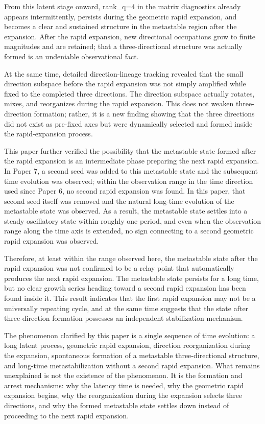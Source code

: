 \documentclass[
  a4paper,
]{article}
\begin{document}
From this latent stage onward, rank\_q=4 in the matrix diagnostics
already appears intermittently, persists during the geometric rapid
expansion, and becomes a clear and sustained structure in the metastable
region after the expansion. After the rapid expansion, new directional
occupations grow to finite magnitudes and are retained; that a
three-directional structure was actually formed is an undeniable
observational fact.

At the same time, detailed direction-lineage tracking revealed that the
small direction subspace before the rapid expansion was not simply
amplified while fixed to the completed three directions. The direction
subspace actually rotates, mixes, and reorganizes during the rapid
expansion. This does not weaken three-direction formation; rather, it is
a new finding showing that the three directions did not exist as
pre-fixed axes but were dynamically selected and formed inside the
rapid-expansion process.

This paper further verified the possibility that the metastable state
formed after the rapid expansion is an intermediate phase preparing the
next rapid expansion. In Paper 7, a second seed was added to this
metastable state and the subsequent time evolution was observed; within
the observation range in the time direction used since Paper 6, no
second rapid expansion was found. In this paper, that second seed itself
was removed and the natural long-time evolution of the metastable state
was observed. As a result, the metastable state settles into a steady
oscillatory state within roughly one period, and even when the
observation range along the time axis is extended, no sign connecting to
a second geometric rapid expansion was observed.

Therefore, at least within the range observed here, the metastable state
after the rapid expansion was not confirmed to be a relay point that
automatically produces the next rapid expansion. The metastable state
persists for a long time, but no clear growth series heading toward a
second rapid expansion has been found inside it. This result indicates
that the first rapid expansion may not be a universally repeating cycle,
and at the same time suggests that the state after three-direction
formation possesses an independent stabilization mechanism.

The phenomenon clarified by this paper is a single sequence of time
evolution: a long latent process, geometric rapid expansion, direction
reorganization during the expansion, spontaneous formation of a
metastable three-directional structure, and long-time metastabilization
without a second rapid expansion. What remains unexplained is not the
existence of the phenomenon. It is the formation and arrest mechanisms:
why the latency time is needed, why the geometric rapid expansion
begins, why the reorganization during the expansion selects three
directions, and why the formed metastable state settles down instead of
proceeding to the next rapid expansion.
\end{document}
